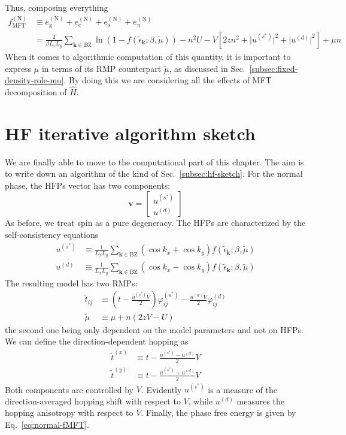 Thus, composing everything
\begin{align}
	f_\mathrm{MFT}^{(\mathrm{N})} &\equiv e_\mathrm{g}^{(\mathrm{N})} + e_\mathrm{c}^{(\mathrm{N})} + e_s^{(\mathrm{N})} + e_n^{(\mathrm{N})} \nonumber \\
	&= \frac{2}{\beta L_x L_y} \sum_{\mathbf{k}\in\mathrm{BZ}} \ln \left(
	1- f( \tilde{\epsilon}_\mathbf{k}; \beta,\tilde{\mu}) \right) - n^2 U - V \left[
		2zn^2 + 
		\big|
			u^{(s^*)}
		\big|^2 + \big|
			u^{(d)}
		\big|^2
	\right] + \mu n \label{eq:normal-fMFT}
\end{align}
When it comes to algorithmic computation of this quantity, it is important to express $\mu$ in terms of its RMP counterpart $\tilde{\mu}$, as discussed in Sec.~\ref{subsec:fixed-density-role-mu}. By doing this we are considering all the effects of MFT decomposition of $\hat H$.

\section{HF iterative algorithm sketch}

We are finally able to move to the computational part of this chapter. The aim is to write down an algorithm of the kind of Sec.~\ref{subsec:hf-sketch}. For the normal phase, the HFPs vector has two components:
\[
	\mathbf{v} = \begin{bmatrix}
		u^{(s^*)} \\ u^{(d)}
	\end{bmatrix}
\]
As before, we treat spin as a pure degeneracy. The HFPs are characterized by the self-consistency equations
\begin{align}
	u^{(s^*)} &\equiv \frac{1}{L_x L_y} \sum_{\mathbf{k}\in\mathrm{BZ}} (\cos k_x + \cos k_y) f(\tilde{\epsilon}_\mathbf{k};\beta,\tilde{\mu}) \\
	u^{(d)} &\equiv \frac{1}{L_x L_y} \sum_{\mathbf{k}\in\mathrm{BZ}} (\cos k_x - \cos k_y) f(\tilde{\epsilon}_\mathbf{k};\beta,\tilde{\mu})
\end{align}
The resulting model has two RMPs:
\begin{align}
	\tilde{t}_{ij} &\equiv \left(
		t - \frac{u^{(s^*)}V}{2}
	\right) \varphi_{ij}^{(s^*)} - \frac{u^{(d)}V}{2} \varphi_{ij}^{(d)} \\
	\tilde{\mu} &\equiv \mu + n (2zV-U)
\end{align}
the second one being only dependent on the model parameters and not on HFPs. We can define the direction-dependent hopping as
\begin{align}
	\tilde{t}^{(x)} &\equiv t - \frac{u^{(s^*)} - u^{(d)}}{2} V \\
	\tilde{t}^{(y)} &\equiv t - \frac{u^{(s^*)} + u^{(d)}}{2} V
\end{align}
Both components are controlled by $V$. Evidently $u^{(s^*)}$ is a measure of the direction-averaged hopping shift with respect to $V$, while $u^{(d)}$ measures the hopping anisotropy with respect to $V$. Finally, the phase free energy is given by Eq.~\eqref{eq:normal-fMFT}. \todo